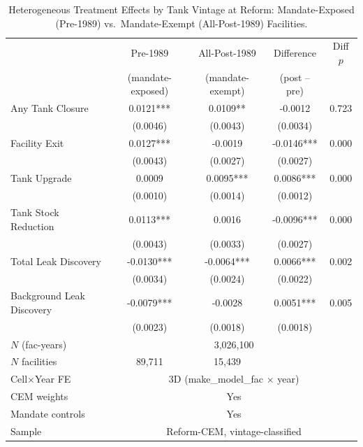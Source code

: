 \begin{table}[htbp]
\centering
\caption{Heterogeneous Treatment Effects by Tank Vintage at Reform: Mandate-Exposed (Pre-1989) vs.\ Mandate-Exempt (All-Post-1989) Facilities.}
\label{tab:hte_vintage}
\begin{tabular}{lcccc}
\toprule
 & Pre-1989 & All-Post-1989 & Difference & Diff $p$ \\
 & (mandate-exposed) & (mandate-exempt) & (post -- pre) & \\
\midrule
Any Tank Closure & 0.0121*** & 0.0109** & -0.0012 & 0.723 \\
 & (0.0046) & (0.0043) & (0.0034) &  \\[0.3em]
Facility Exit & 0.0127*** & -0.0019 & -0.0146*** & 0.000 \\
 & (0.0043) & (0.0027) & (0.0027) &  \\[0.3em]
Tank Upgrade & 0.0009 & 0.0095*** & 0.0086*** & 0.000 \\
 & (0.0010) & (0.0014) & (0.0012) &  \\[0.3em]
Tank Stock Reduction & 0.0113*** & 0.0016 & -0.0096*** & 0.000 \\
 & (0.0043) & (0.0033) & (0.0027) &  \\[0.3em]
Total Leak Discovery & -0.0130*** & -0.0064*** & 0.0066*** & 0.002 \\
 & (0.0034) & (0.0024) & (0.0022) &  \\[0.3em]
Background Leak Discovery & -0.0079*** & -0.0028 & 0.0051*** & 0.005 \\
 & (0.0023) & (0.0018) & (0.0018) &  \\[0.3em]
\midrule
$N$ (fac-years) & \multicolumn{4}{c}{3,026,100} \\
$N$ facilities  & 89,711 & 15,439 & \multicolumn{2}{c}{} \\
Cell$\times$Year FE & \multicolumn{4}{c}{3D (make\_model\_fac $\times$ year)} \\
CEM weights          & \multicolumn{4}{c}{Yes} \\
Mandate controls     & \multicolumn{4}{c}{Yes} \\
Sample               & \multicolumn{4}{c}{Reform-CEM, vintage-classified} \\
\bottomrule
\end{tabular}
\begin{minipage}{\linewidth}
\small

\end{minipage}
\end{table}
